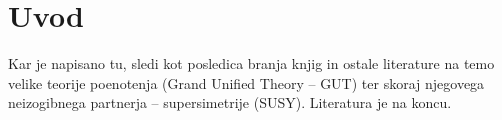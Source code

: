 \section{Uvod}

Kar je napisano tu, sledi kot posledica branja knjig in ostale literature na temo velike
teorije poenotenja (Grand Unified Theory -- GUT) ter skoraj njegovega neizogibnega
partnerja -- supersimetrije (SUSY). Literatura je na koncu.
